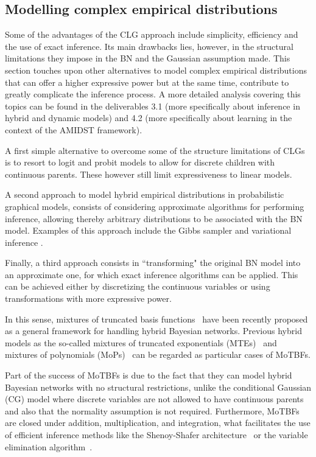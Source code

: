 \subsection{Modelling complex empirical distributions}


Some of the advantages of the CLG approach include simplicity, efficiency and the use of exact inference. Its main drawbacks lies, however, in the structural limitations they impose in the BN and the Gaussian assumption made. This section touches upon other alternatives to model complex empirical distributions that can offer a higher expressive power but at the same time, contribute to greatly complicate the inference process. A more detailed analysis covering this topics can be found in the deliverables 3.1 (more specifically about inference in hybrid and dynamic models) and 4.2 (more specifically about learning in the context of the AMIDST framework).  

A first simple alternative to overcome some of the structure limitations of CLGs is to resort to logit and probit models to allow for discrete children with continuous parents. These however still limit expressiveness to linear models.

A second approach to model hybrid empirical distributions in probabilistic graphical models, consists of considering approximate algorithms for performing inference, allowing thereby arbitrary distributions to be associated with the BN model. Examples of this approach include the Gibbs sampler \cite{Geman1984, hrycej1990gibbs} and variational inference \cite{Jordan1999}. 

Finally, a third approach consists in ``transforming" the original BN model into an approximate one, for which exact inference algorithms can be applied. This can be achieved either by discretizing the continuous variables \cite{KozlovKollerUAI97} or using transformations with more expressive power. 

In this sense, mixtures of truncated basis functions~\cite{Langseth12} have been recently proposed as a general framework for handling hybrid Bayesian networks. Previous hybrid models as the so-called mixtures of truncated exponentials (MTEs)~\cite{Moral2001} and mixtures of polynomials (MoPs)~\cite{Shenoy2011} can be regarded as particular cases of MoTBFs. 

Part of the success of MoTBFs is due to the fact that they can model hybrid Bayesian networks with no structural restrictions, unlike the conditional Gaussian (CG) model where discrete variables are not allowed to have continuous parents and also that the normality assumption is not required. Furthermore, MoTBFs are closed under addition, multiplication, and integration, what facilitates the use of efficient inference methods like the Shenoy-Shafer architecture~\cite{She90} or the variable elimination algorithm~\cite{Zha96}. 

